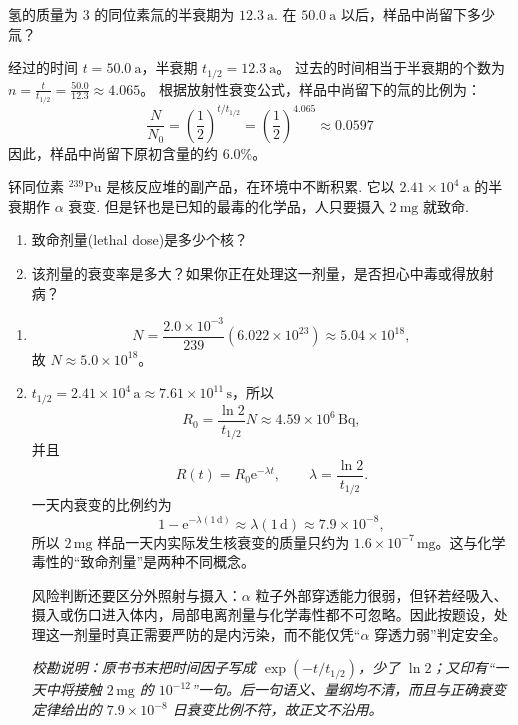 \begin{exercise}\label{ex:29.14}
氢的质量为 $3$ 的同位素氚的半衰期为 $12.3 \ \mathrm{a}$. 在 $50.0 \ \mathrm{a}$ 以后，样品中尚留下多少氚？
\end{exercise}
\begin{solution}
经过的时间 $t = 50.0 \ \mathrm{a}$，半衰期 $t_{1/2} = 12.3 \ \mathrm{a}$。
过去的时间相当于半衰期的个数为 $n = \frac{t}{t_{1/2}} = \frac{50.0}{12.3} \approx 4.065$。
根据放射性衰变公式，样品中尚留下的氚的比例为：
$$ \frac{N}{N_0} = \left( \frac{1}{2} \right)^{t / t_{1/2}} = \left( \frac{1}{2} \right)^{4.065} \approx 0.0597 $$
因此，样品中尚留下原初含量的约 $6.0\%$。
\end{solution}

\begin{exercise}\label{ex:29.15}
钚同位素 $^{239}\mathrm{Pu}$ 是核反应堆的副产品，在环境中不断积累. 它以 $2.41 \times 10^4 \ \mathrm{a}$ 的半衰期作 $\alpha$ 衰变. 但是钚也是已知的最毒的化学品，人只要摄入 $2 \ \mathrm{mg}$ 就致命. 
\begin{enumerate}
  \item[(a)] 致命剂量(lethal dose)是多少个核？
  \item[(b)] 该剂量的衰变率是多大？如果你正在处理这一剂量，是否担心中毒或得放射病？
\end{enumerate}
\end{exercise}
\begin{solution}
\begin{enumerate}
\item[(a)]
$$
N=\frac{2.0\times10^{-3}}{239}(6.022\times10^{23})\approx5.04\times10^{18},
$$
故 $\boxed{N\approx5.0\times10^{18}}$。
\item[(b)] $t_{1/2}=2.41\times10^4\,\mathrm a\approx7.61\times10^{11}\,\mathrm s$，所以
$$
R_0=\frac{\ln2}{t_{1/2}}N\approx4.59\times10^6\,\mathrm{Bq},
$$
并且
$$
\boxed{R(t)=R_0\mathrm{e}^{-\lambda t}},\qquad \lambda=\frac{\ln2}{t_{1/2}}.
$$
一天内衰变的比例约为
$$
1-\mathrm{e}^{-\lambda(1\,\mathrm d)}\approx\lambda(1\,\mathrm d)
\approx7.9\times10^{-8},
$$
所以 $2\,\mathrm{mg}$ 样品一天内实际发生核衰变的质量只约为 $1.6\times10^{-7}\,\mathrm{mg}$。这与化学毒性的“致命剂量”是两种不同概念。

风险判断还要区分外照射与摄入：$\alpha$ 粒子外部穿透能力很弱，但钚若经吸入、摄入或伤口进入体内，局部电离剂量与化学毒性都不可忽略。因此按题设，处理这一剂量时真正需要严防的是内污染，而不能仅凭“$\alpha$ 穿透力弱”判定安全。

\textit{校勘说明：原书书末把时间因子写成 $\exp(-t/t_{1/2})$，少了 $\ln2$；又印有“一天中将接触 $2\,\mathrm{mg}$ 的 $10^{-12}$”一句。后一句语义、量纲均不清，而且与正确衰变定律给出的 $7.9\times10^{-8}$ 日衰变比例不符，故正文不沿用。}
\end{enumerate}
\end{solution}

